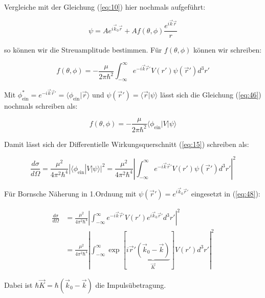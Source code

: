 Vergleiche mit der Gleichung (\ref{eq:10}) hier nochmals aufgeführt:

\begin{equation}
  \label{eq:45}
  \psi = A e^{i\vec k_{0}\vec r} + A f(\theta,\phi)\frac{e^{i\vec k\vec r}}{r} 
\end{equation}


so können wir die Streuamplitude bestimmen. Für \(f(\theta,\phi)\) können wir schreiben:

\begin{equation}
  \label{eq:46}
  \boxed{ f(\theta,\phi) = - \frac{\mu}{2\pi\hbar^2}\int_{-\infty}^\infty e^{- i\vec k\vec r' }  V(r') \psi(\vec r') d^3 r' }
\end{equation}

Mit \(\phi_{\text{ein}}^* =e^{- i\vec k\vec r' } = \langle\phi_{\text{ein}}|\vec r\rangle  \) und \(\psi(\vec r') = \langle \vec r| \psi\rangle \) lässt sich die Gleichung (\ref{eq:46}) nochmals schreiben als:

\begin{equation}
  \label{eq:47}
   \boxed{ f(\theta,\phi) = - \frac{\mu}{2\pi\hbar^2} \langle\phi_{\text{ein}}|  V |\psi\rangle }
\end{equation}


Damit lässt sich der Differentielle Wirkungsquerschnitt (\ref{eq:15})  schreiben als:

\begin{equation}
  \label{eq:48}
  \boxed{  \frac{d\sigma}{d\Omega}= \frac{\mu^2}{4\pi^2\hbar^4} |\langle\phi_{\text{ein}}|  V |\psi\rangle |^2 = \frac{\mu^2}{4\pi^2\hbar^4} \left| \int_{-\infty}^\infty e^{- i\vec k\vec r' }  V(r') \psi(\vec r') d^3 r' \right|^2  }
\end{equation}


Für Bornsche Näherung in 1.Ordnung mit \(\psi(\vec r') = e^{i\vec k_0\vec r'}\) eingesetzt in (\ref{eq:48}):

\begin{align}
  \label{eq:49}
  \frac{d\sigma}{d\Omega} &=  \frac{\mu^2}{4\pi^2\hbar^4} \left| \int_{-\infty}^\infty e^{- i\vec k\vec r' }  V(r')  e^{i\vec k_0\vec r'} d^3 r' \right|^2 \\
&=  \frac{\mu^2}{4\pi^2\hbar^4} \left| \int_{-\infty}^\infty \exp[i\vec r'\underbrace{(\vec k_0 -\vec k)}_{\vec K} ]  V(r')  d^3 r' \right|^2 
\end{align}

Dabei ist \(\hbar \vec K = \hbar (\vec k_0 - \vec k)\) die Impulsübetragung. 

